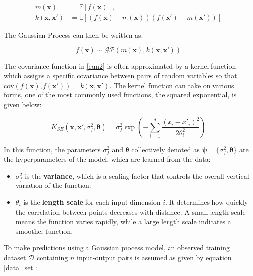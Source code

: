 \documentclass[12pt]{article}
\begin{document}
\begin{equation}
	\label{eqn2}
	\begin{aligned}
		m(\mathbf{x}) &= \mathbb{E}[f(\mathbf{x})], \\
		k(\mathbf{x}, \mathbf{x}') &= \mathbb{E}[(f(\mathbf{x}) - m(\mathbf{x}))(f(\mathbf{x}') - m(\mathbf{x}'))]
	\end{aligned}
\end{equation}

The Gaussian Process can then be written as:

\begin{equation}
	\label{eqn3}
	f(\mathbf{x}) \sim \mathcal{GP}(m(\mathbf{x}), k(\mathbf{x}, \mathbf{x}'))
\end{equation}

The covariance function in \eqref{eqn2} is often approximated by a kernel function which assigns a specific covariance between pairs of random variables so that $\text{cov}\left(f(\mathbf{x}), f(\mathbf{x}')\right) = k(\mathbf{x}, \mathbf{x}')$. The kernel function can take on various forms, one of the most commonly used functions, the squared exponential, is given below:

\begin{equation}
	\label{eqn4}
	K_{SE}(\mathbf{x}, \mathbf{x}', \sigma_f^2, \boldsymbol{\theta}) = \sigma_f^2 \exp\left(-\sum\limits_{i = 1}^{d} \frac{(x_i - x'_i)^2}{2 \theta_i^2} \right)
\end{equation}

In this function, the parameters $\sigma_f^2$ and $\boldsymbol{\theta}$ collectively denoted as $\boldsymbol{\psi} = \{\sigma_f^2, \boldsymbol{\theta}\}$ are the hyperparameters of the model, which are learned from the data:

\begin{itemize}
	\item $\sigma_f^2$ is the \textbf{variance}, which is a scaling factor that controls the overall vertical variation of the function.
	\item $\theta_i$ is the \textbf{length scale} for each input dimension $i$. It determines how quickly the correlation between points decreases with distance. A small length scale means the function varies rapidly, while a large length scale indicates a smoother function.
\end{itemize}

To make predictions using a Gaussian process model, an observed training dataset $\mathcal{D}$ containing $n$ input-output pairs is assumed as given by equation \eqref{data_set}:
\end{document}
